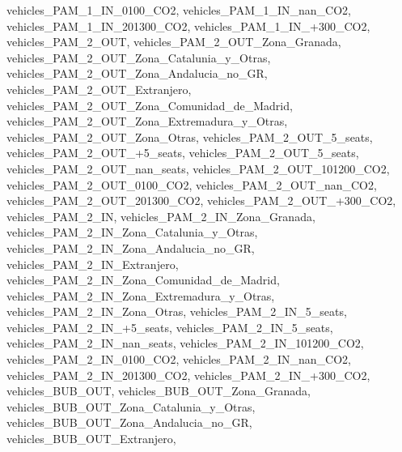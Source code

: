 \documentclass[letterpaper,10pt,english]{sphinxmanual}
\begin{document}
\begin{fulllineitems}
\textquotesingle{}vehicles\_PAM\_1\_IN\_0\sphinxhyphen{}100\_CO2\textquotesingle{}, \textquotesingle{}vehicles\_PAM\_1\_IN\_nan\_CO2\textquotesingle{}, \textquotesingle{}vehicles\_PAM\_1\_IN\_201\sphinxhyphen{}300\_CO2\textquotesingle{}, \textquotesingle{}vehicles\_PAM\_1\_IN\_+300\_CO2\textquotesingle{}, \textquotesingle{}vehicles\_PAM\_2\_OUT\textquotesingle{}, \textquotesingle{}vehicles\_PAM\_2\_OUT\_Zona\_Granada\textquotesingle{}, \textquotesingle{}vehicles\_PAM\_2\_OUT\_Zona\_Catalunia\_y\_Otras\textquotesingle{}, \textquotesingle{}vehicles\_PAM\_2\_OUT\_Zona\_Andalucia\_no\_GR\textquotesingle{}, \textquotesingle{}vehicles\_PAM\_2\_OUT\_Extranjero\textquotesingle{}, \textquotesingle{}vehicles\_PAM\_2\_OUT\_Zona\_Comunidad\_de\_Madrid\textquotesingle{}, \textquotesingle{}vehicles\_PAM\_2\_OUT\_Zona\_Extremadura\_y\_Otras\textquotesingle{}, \textquotesingle{}vehicles\_PAM\_2\_OUT\_Zona\_Otras\textquotesingle{}, \textquotesingle{}vehicles\_PAM\_2\_OUT\_5\_seats\textquotesingle{}, \textquotesingle{}vehicles\_PAM\_2\_OUT\_+5\_seats\textquotesingle{}, \textquotesingle{}vehicles\_PAM\_2\_OUT\_\sphinxhyphen{}5\_seats\textquotesingle{}, \textquotesingle{}vehicles\_PAM\_2\_OUT\_nan\_seats\textquotesingle{}, \textquotesingle{}vehicles\_PAM\_2\_OUT\_101\sphinxhyphen{}200\_CO2\textquotesingle{}, \textquotesingle{}vehicles\_PAM\_2\_OUT\_0\sphinxhyphen{}100\_CO2\textquotesingle{}, \textquotesingle{}vehicles\_PAM\_2\_OUT\_nan\_CO2\textquotesingle{}, \textquotesingle{}vehicles\_PAM\_2\_OUT\_201\sphinxhyphen{}300\_CO2\textquotesingle{}, \textquotesingle{}vehicles\_PAM\_2\_OUT\_+300\_CO2\textquotesingle{}, \textquotesingle{}vehicles\_PAM\_2\_IN\textquotesingle{}, \textquotesingle{}vehicles\_PAM\_2\_IN\_Zona\_Granada\textquotesingle{}, \textquotesingle{}vehicles\_PAM\_2\_IN\_Zona\_Catalunia\_y\_Otras\textquotesingle{}, \textquotesingle{}vehicles\_PAM\_2\_IN\_Zona\_Andalucia\_no\_GR\textquotesingle{}, \textquotesingle{}vehicles\_PAM\_2\_IN\_Extranjero\textquotesingle{}, \textquotesingle{}vehicles\_PAM\_2\_IN\_Zona\_Comunidad\_de\_Madrid\textquotesingle{}, \textquotesingle{}vehicles\_PAM\_2\_IN\_Zona\_Extremadura\_y\_Otras\textquotesingle{}, \textquotesingle{}vehicles\_PAM\_2\_IN\_Zona\_Otras\textquotesingle{}, \textquotesingle{}vehicles\_PAM\_2\_IN\_5\_seats\textquotesingle{}, \textquotesingle{}vehicles\_PAM\_2\_IN\_+5\_seats\textquotesingle{}, \textquotesingle{}vehicles\_PAM\_2\_IN\_\sphinxhyphen{}5\_seats\textquotesingle{}, \textquotesingle{}vehicles\_PAM\_2\_IN\_nan\_seats\textquotesingle{}, \textquotesingle{}vehicles\_PAM\_2\_IN\_101\sphinxhyphen{}200\_CO2\textquotesingle{}, \textquotesingle{}vehicles\_PAM\_2\_IN\_0\sphinxhyphen{}100\_CO2\textquotesingle{}, \textquotesingle{}vehicles\_PAM\_2\_IN\_nan\_CO2\textquotesingle{}, \textquotesingle{}vehicles\_PAM\_2\_IN\_201\sphinxhyphen{}300\_CO2\textquotesingle{}, \textquotesingle{}vehicles\_PAM\_2\_IN\_+300\_CO2\textquotesingle{}, \textquotesingle{}vehicles\_BUB\_OUT\textquotesingle{}, \textquotesingle{}vehicles\_BUB\_OUT\_Zona\_Granada\textquotesingle{}, \textquotesingle{}vehicles\_BUB\_OUT\_Zona\_Catalunia\_y\_Otras\textquotesingle{}, \textquotesingle{}vehicles\_BUB\_OUT\_Zona\_Andalucia\_no\_GR\textquotesingle{}, \textquotesingle{}vehicles\_BUB\_OUT\_Extranjero\textquotesingle{}, 
\end{fulllineitems}
\end{document}
